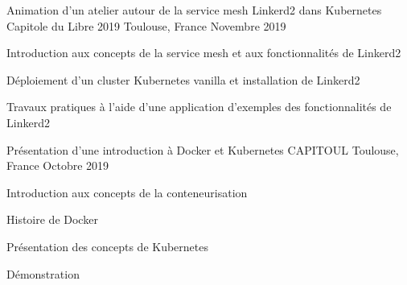 

\begin{cventries}

  \cventry
    {Animation d'un atelier autour de la service mesh Linkerd2 dans Kubernetes} %
    {Capitole du Libre 2019} %
    {Toulouse, France} %
    {Novembre 2019} %
    {
      \begin{cvitems} %
        \item {Introduction aux concepts de la service mesh et aux fonctionnalités de Linkerd2}
        \item {Déploiement d'un cluster Kubernetes vanilla et installation de Linkerd2}
        \item {Travaux pratiques à l'aide d'une application d'exemples des fonctionnalités de Linkerd2}
      \end{cvitems}
    }

  \cventry
    {Présentation d'une introduction à Docker et Kubernetes} %
    {CAPITOUL} %
    {Toulouse, France} %
    {Octobre 2019} %
    {
      \begin{cvitems} %
        \item {Introduction aux concepts de la conteneurisation}
        \item {Histoire de Docker}
        \item {Présentation des concepts de Kubernetes}
        \item {Démonstration}
      \end{cvitems}
    }

\end{cventries}
